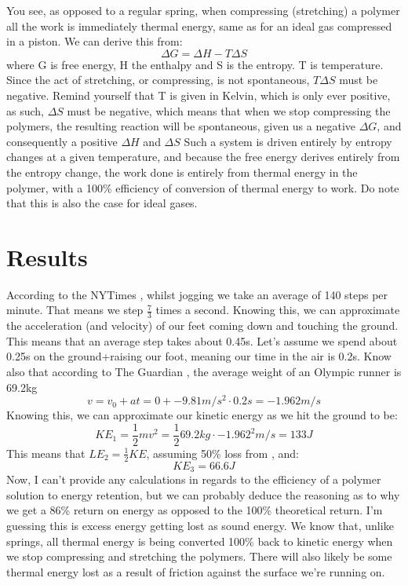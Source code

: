 \documentclass{article}
\begin{document}
You see, as opposed to a regular spring, when compressing (stretching) a polymer all the work is immediately thermal energy, same as for an ideal gas compressed in a piston. We can derive this from:
\begin{equation*}
    \Delta G = \Delta H - T \Delta S
\end{equation*}
where G is free energy, H the enthalpy and S is the entropy. T is temperature. Since the act of stretching, or compressing, is not spontaneous, $T\Delta S$ must be negative. Remind yourself that T is given in Kelvin, which is only ever positive, as such, $\Delta S$ must be negative, which means that when we stop compressing the polymers, the resulting reaction will be spontaneous, given us a negative $\Delta G$, and consequently a positive $\Delta H$ and $\Delta S$ 
\newline Such a system is driven entirely by entropy changes at a given temperature, and because the free energy derives entirely from the entropy change, the work done is entirely from thermal energy in the polymer, with a 100\% efficiency of conversion of thermal energy to work. Do note that this is also the case for ideal gases.\newpage
\section{Results}
According to the NYTimes \cite{sourc5}, whilst jogging we take an average of 140 steps per minute. That means we step $\frac{7}{3}$ times a second. Knowing this, we can approximate the acceleration (and velocity) of our feet coming down and touching the ground. This means that an average step takes about 0.45s. Let's assume we spend about 0.25s on the ground+raising our foot, meaning our time in the air is 0.2s. Know also that according to The Guardian \cite{sourc6}, the average weight of an Olympic runner is 69.2kg
\begin{equation*}
    v = v_0 + at = 0 + -9.81 m/s^2 \cdot 0.2s = -1.962 m/s
\end{equation*}
Knowing this, we can approximate our kinetic energy as we hit the ground to be:
\begin{equation*}
    KE_1 = \frac{1}{2}mv^2 = \frac{1}{2} 69.2kg \cdot -1.962^2 m/s = 133 J
\end{equation*}
This means that $LE_2 = \frac{1}{2} KE$, assuming 50\% loss from \cite{sourc4}, and:
\begin{equation*}
    KE_3 = 66.6 J
\end{equation*}
\newline
Now, I can't provide any calculations in regards to the efficiency of a polymer solution to energy retention, but we can probably deduce the reasoning as to why we get a 86\% return on energy as opposed to the 100\% theoretical return. I'm guessing this is excess energy getting lost as sound energy. We know that, unlike springs, all thermal energy is being converted 100\% back to kinetic energy when we stop compressing and stretching the polymers. There will also likely be some thermal energy lost as a result of friction against the surface we're running on.
\end{document}
